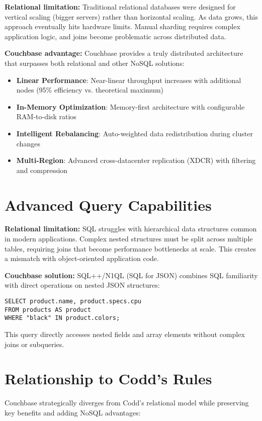 \textbf{Relational limitation:} Traditional relational databases were designed for vertical scaling (bigger servers) rather than horizontal scaling. As data grows, this approach eventually hits hardware limits. Manual sharding requires complex application logic, and joins become problematic across distributed data.

\textbf{Couchbase advantage:} Couchbase provides a truly distributed architecture that surpasses both relational and other NoSQL solutions:
\begin{itemize}
  \item \textbf{Linear Performance}: Near-linear throughput increases with additional nodes (95\% efficiency vs. theoretical maximum)
  \item \textbf{In-Memory Optimization}: Memory-first architecture with configurable RAM-to-disk ratios
  \item \textbf{Intelligent Rebalancing}: Auto-weighted data redistribution during cluster changes
  \item \textbf{Multi-Region}: Advanced cross-datacenter replication (XDCR) with filtering and compression
\end{itemize}

\section{Advanced Query Capabilities}

\textbf{Relational limitation:} SQL struggles with hierarchical data structures common in modern applications. Complex nested structures must be split across multiple tables, requiring joins that become performance bottlenecks at scale. This creates a mismatch with object-oriented application code.

\textbf{Couchbase solution:} SQL++/N1QL (SQL for JSON) combines SQL familiarity with direct operations on nested JSON structures:

\begin{verbatim}
SELECT product.name, product.specs.cpu
FROM products AS product
WHERE "black" IN product.colors;
\end{verbatim}

This query directly accesses nested fields and array elements without complex joins or subqueries.

\section{Relationship to Codd's Rules}
Couchbase strategically diverges from Codd's relational model while preserving key benefits and adding NoSQL advantages:

